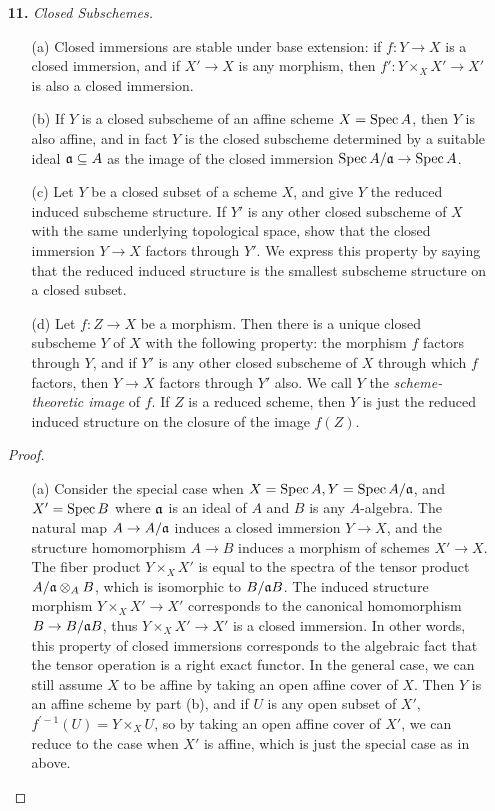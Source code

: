 \documentclass{article}
\begin{document}
\begin{enumerate} [label=\textbf{\arabic*.}, leftmargin=0em]
\item[\textbf{11.}] \textit{Closed Subschemes.}
\begin{itemize} [leftmargin=0cm]
    \item[(a)] Closed immersions are stable under base extension: if $f : Y \to X$ is a closed immersion, and if $X' \to X$ is any morphism, then $f' : Y \times_X X' \to X'$ is also a closed immersion.

    \item[(b)] If $Y$ is a closed subscheme of an affine scheme $X = \operatorname{Spec}{A}$, then $Y$ is also affine, and in fact $Y$ is the closed subscheme determined by a suitable ideal $\mathfrak{a} \subseteq A$ as the image of the closed immersion $\operatorname{Spec}{A / \mathfrak{a}} \to \operatorname{Spec}{A}$.

    \item[(c)] Let $Y$ be a closed subset of a scheme $X$, and give $Y$ the reduced induced subscheme structure. If $Y'$ is any other closed subscheme of $X$ with the same underlying topological space, show that the closed immersion $Y \to X$ factors through $Y'$. We express this property by saying that the reduced induced structure is the smallest subscheme structure on a closed subset.

    \item[(d)] Let $f : Z \to X$ be a morphism. Then there is a unique closed subscheme $Y$ of $X$ with the following property: the morphism $f$ factors through $Y$, and if $Y'$ is any other closed subscheme of $X$ through which $f$ factors, then $Y \to X$ factors through $Y'$ also. We call $Y$ the \textit{scheme-theoretic image} of $f$. If $Z$ is a reduced scheme, then $Y$ is just the reduced induced structure on the closure of the image $f(Z)$.
\end{itemize}

\begin{proof} $ $ \vspace{0pt}
   \begin{itemize} [leftmargin=0cm]
    \item[(a)] Consider the special case when $X = \operatorname{Spec}{A}, Y = \operatorname{Spec}{A / \mathfrak{a}}$, and $X' = \operatorname{Spec}{B}$ where $\mathfrak{a}$ is an ideal of $A$ and $B$ is any $A$-algebra. The natural map $A \to A / \mathfrak{a}$ induces a closed immersion $Y \to X$, and the structure homomorphism $A \to B$ induces a morphism of schemes $X' \to X$. The fiber product $Y \times_X X'$ is equal to the spectra of the tensor product $A / \mathfrak{a} \otimes_A B$, which is isomorphic to $B / \mathfrak{a}B$. The induced structure morphism $Y \times_X X' \to X'$ corresponds to the canonical homomorphism $B \to B / \mathfrak{a} B$, thus $Y \times_X X' \to X'$ is a closed immersion. In other words, this property of closed immersions corresponds to the algebraic fact that the tensor operation is a right exact functor. In the general case, we can still assume $X$ to be affine by taking an open affine cover of $X$. Then $Y$ is an affine scheme by part (b), and if $U$ is any open subset of $X'$, $f^{'-1}(U) = Y \times_X U$, so by taking an open affine cover of $X'$, we can reduce to the case when $X'$ is affine, which is just the special case as in above.


\end{itemize}
\end{proof}
\end{enumerate}
\end{document}
